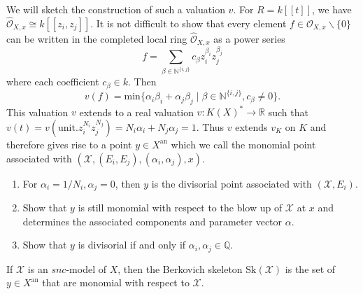 We will sketch the construction of such a valuation $v$. For $R=k[[t]]$, we have $\hat{\mathcal{O}}_{X,x}\cong k[[z_{i},
z_{j}]]$. It is not difficult to show that every element $f\in\mathcal{O}_{X,x}\backslash\{0\}$ can be written
in the completed local ring $\hat{\mathcal{O}}_{X,x}$ as a power series
\[ f=\sum_{\beta\in\mathbb{N}^{\{i,j\}}}c_{\beta}z_{i}^{\beta_{i}}z_{j}^{\beta_{j}} \]
where each coefficient $c_{\beta}\in k$. Then
\[ v(f)=\mathrm{min}\{\alpha_{i}\beta_{i}+\alpha_{j}\beta_{j}\mid\beta\in\mathbb{N}^{\{i,j\}},c_{\beta}\neq 0\}. \]
This valuation $v$ extends to a real valuation $v:K(X)^{*}\rightarrow\mathbb{R}$ such that
$v(t)=v(\mathrm{unit}.z_{i}^{N_{i}}z_{j}^{N_{j}})=N_{i}\alpha_{i}+N_{j}\alpha_{j}=1$. Thus $v$ extends
$v_{K}$ on $K$ and therefore gives rise to a point $y\in X^{\mathrm{an}}$ which we call the monomial point
associated with $(\mathscr{X},(E_{i},E_{j}),(\alpha_{i},\alpha_{j}),x)$.

\begin{exercise}
  \begin{enumerate}
    \item For $\alpha_{i}=1/N_{i},\alpha_{j}=0$, then $y$ is the divisorial point associated with $(\mathscr{X},E_{i})$.
    \item Show that $y$ is still monomial with respect to the blow up of $\mathscr{X}$ at $x$ and determines
          the associated components and parameter vector $\alpha$.
    \item Show that $y$ is divisorial if and only if $\alpha_{i},\alpha_{j}\in\mathbb{Q}$.
  \end{enumerate}
\end{exercise}

\begin{definition}
If $\mathscr{X}$ is an $snc$-model of $X$, then the Berkovich skeleton $\mathrm{Sk}(\mathscr{X})$ is the set
of $y\in X^{\mathrm{an}}$ that are monomial with respect to $\mathscr{X}$.
\end{definition}

